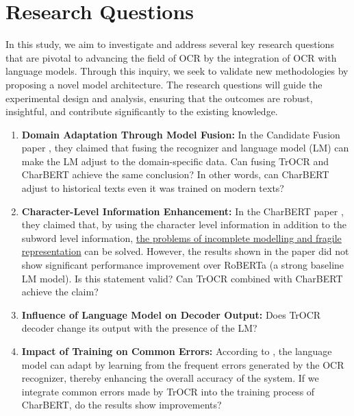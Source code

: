 \section{Research Questions}
\label{sec:1_research_questions}
In this study, we aim to investigate and address several key research questions that are pivotal to advancing the field of OCR by the integration of OCR with language models. Through this inquiry, we seek to validate new methodologies by proposing a novel model architecture. The research questions will guide the experimental design and analysis, ensuring that the outcomes are robust, insightful, and contribute significantly to the existing knowledge.
\begin{enumerate}
    \item \textbf{Domain Adaptation Through Model Fusion: }In the Candidate Fusion paper , they claimed that fusing the recognizer and language model (LM) can make the LM adjust to the domain-specific data. Can fusing TrOCR and CharBERT achieve the same conclusion? In other words, can CharBERT adjust to historical texts even it was trained on modern texts?
    \item \textbf{Character-Level Information Enhancement: }In the CharBERT paper \citep{ma-etal-2020-charbert}, they claimed that, by using the character level information in addition to the subword level information, \hyperref[sec:2_charbert]{the problems of incomplete modelling and fragile 
    representation} can be solved. However, the results shown in the paper did not show significant performance improvement over RoBERTa (a strong baseline LM model). Is this statement valid? Can TrOCR combined with CharBERT achieve the claim?
    \item \textbf{Influence of Language Model on Decoder Output: }Does TrOCR decoder change its output with the presence of the LM?
    \item \textbf{Impact of Training on Common Errors:} According to \cite{kang2021candidate}, the language model can adapt by learning from the frequent errors generated by the OCR recognizer, thereby enhancing the overall accuracy of the system. If we integrate common errors made by TrOCR into the training process of CharBERT, do the results show improvements? 
\end{enumerate}

